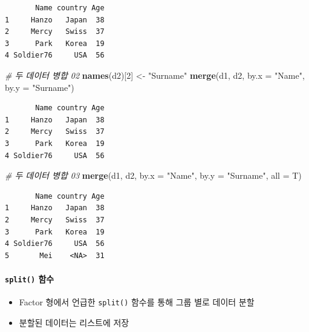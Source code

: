\documentclass[
  11pt,
]{krantz}
\newenvironment{Shaded}{\begin{snugshade}}{\end{snugshade}}
\newcommand{\CommentTok}[1]{\textcolor[rgb]{0.37,0.37,0.37}{\textit{#1}}}
\newcommand{\DataTypeTok}[1]{\textcolor[rgb]{0.27,0.27,0.27}{#1}}
\newcommand{\DecValTok}[1]{\textcolor[rgb]{0.06,0.06,0.06}{#1}}
\newcommand{\KeywordTok}[1]{\textcolor[rgb]{0.27,0.27,0.27}{\textbf{#1}}}
\newcommand{\NormalTok}[1]{#1}
\newcommand{\StringTok}[1]{\textcolor[rgb]{0.5,0.5,0.5}{#1}}
\providecommand{\tightlist}{%
  \setlength{\itemsep}{0pt}\setlength{\parskip}{0pt}}
\begin{document}
\begin{verbatim}
       Name country Age
1     Hanzo   Japan  38
2     Mercy   Swiss  37
3      Park   Korea  19
4 Soldier76     USA  56
\end{verbatim}

\begin{Shaded}
\begin{Highlighting}[]
\CommentTok{# 두 데이터 병합 02}
\KeywordTok{names}\NormalTok{(d2)[}\DecValTok{2}\NormalTok{] <-}\StringTok{ "Surname"}
\KeywordTok{merge}\NormalTok{(d1, d2, }\DataTypeTok{by.x =} \StringTok{"Name"}\NormalTok{, }\DataTypeTok{by.y =} \StringTok{"Surname"}\NormalTok{)}
\end{Highlighting}
\end{Shaded}

\begin{verbatim}
       Name country Age
1     Hanzo   Japan  38
2     Mercy   Swiss  37
3      Park   Korea  19
4 Soldier76     USA  56
\end{verbatim}

\begin{Shaded}
\begin{Highlighting}[]
\CommentTok{# 두 데이터 병합 03}
\KeywordTok{merge}\NormalTok{(d1, d2, }
      \DataTypeTok{by.x =} \StringTok{"Name"}\NormalTok{, }\DataTypeTok{by.y =} \StringTok{"Surname"}\NormalTok{, }
      \DataTypeTok{all =}\NormalTok{ T)}
\end{Highlighting}
\end{Shaded}

\begin{verbatim}
       Name country Age
1     Hanzo   Japan  38
2     Mercy   Swiss  37
3      Park   Korea  19
4 Soldier76     USA  56
5       Mei    <NA>  31
\end{verbatim}

\normalsize

\hypertarget{split-df}{%
\paragraph{\texorpdfstring{\texttt{split()} 함수}{split() 함수}}\label{split-df}}

\begin{itemize}
\tightlist
\item
  Factor 형에서 언급한 \texttt{split()} 함수를 통해 그룹 별로 데이터 분할
\item
  분할된 데이터는 리스트에 저장
\end{itemize}
\end{document}
